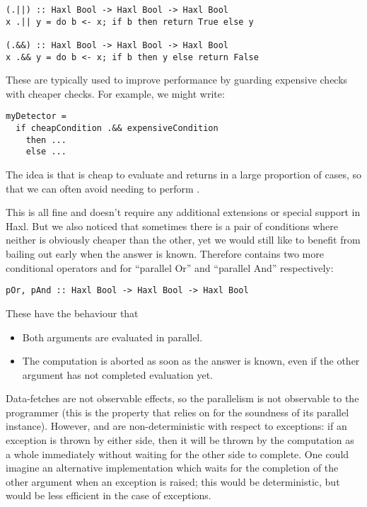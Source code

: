 \begin{verbatim}
(.||) :: Haxl Bool -> Haxl Bool -> Haxl Bool
x .|| y = do b <- x; if b then return True else y

(.&&) :: Haxl Bool -> Haxl Bool -> Haxl Bool
x .&& y = do b <- x; if b then y else return False
\end{verbatim}

These are typically used to improve performance by guarding expensive
checks with cheaper checks.  For example, we might write:

\begin{verbatim}
myDetector =
  if cheapCondition .&& expensiveCondition
    then ...
    else ...
\end{verbatim}

\noindent The idea is that  is cheap to evaluate and
returns  in a large proportion of cases, so that we can
often avoid needing to perform .

This is all fine and doesn't require any additional extensions or
special support in Haxl. But we also noticed that sometimes there is a
pair of conditions where neither is obviously cheaper than the other,
yet we would still like to benefit from bailing out early when the
answer is known.  Therefore \Haxl contains two more conditional
operators  and  for ``parallel Or'' and ``parallel
And'' respectively:

\begin{verbatim}
pOr, pAnd :: Haxl Bool -> Haxl Bool -> Haxl Bool
\end{verbatim}

These have the behaviour that

\begin{itemize}
\item Both arguments are evaluated in parallel.
\item The computation is aborted as soon as the answer is known, even
  if the other argument has not completed evaluation yet.
\end{itemize}

Data-fetches are not observable effects, so the parallelism is not
observable to the programmer (this is the property that \Haxl relies
on for the soundness of its parallel 
instance). However,  and  are non-deterministic with
respect to exceptions: if an exception is thrown by either side, then
it will be thrown by the computation as a whole immediately without
waiting for the other side to complete.  One could imagine an
alternative implementation which waits for the completion of the other
argument when an exception is raised; this would be deterministic, but
would be less efficient in the case of exceptions.

